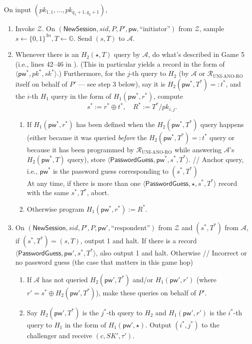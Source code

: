 \documentclass{article}
\theoremstyle{plain}
\theoremstyle{definition}
\theoremstyle{remark}
\newcommand{\group}{\mathbb{G}}
\newcommand{\adv}{\mathcal{A}}
\newcommand{\env}{\mathcal{Z}}
\newcommand{\red}{\mathcal{R}}
\newcommand{\pw}{\mathsf{pw}}
\newcommand{\NewSession}{\mathsf{NewSession}}
\begin{document}
\medskip\noindent
On input $(pk_{1,1},\dots,pk_{q_1+1,q_2+1})$,
\begin{enumerate}
  \item Invoke $\env$. On $(\NewSession, sid, P, P', \pw, \text{``initiator''})$ from $\env$, sample $s \gets \{0,1\}^{3n}, T \gets \group$. Send $(s,T)$ to $\adv$.
  \item Whenever there is an $H_2(\star,T)$ query by $\adv$, do what's described in Game 5 (i.e., lines 42--46 in ). (This in particular yields a record in the form of $\langle\pw^*,pk^*,sk^*\rangle$.) Furthermore, for the $j$-th query to $H_2$ (by $\adv$ or $\red_\text{UNI-ANO-RO}$ itself on behalf of $P'$ --- see step 3 below), say it is $H_2(\pw^*,T^*) =: t^*$, and the $i$-th $H_1$ query in the form of $H_1(\pw^*,r^*)$, compute
      \[
      s^* := r^* \oplus t^*, \quad R^* := T^*/pk_{i,j}.
      \]
      \begin{enumerate}
        \item If $H_1(\pw^*,r^*)$ has been defined when the $H_2(\pw^*,T^*)$ query happens (either because it was queried \emph{before} the $H_2(\pw^*,T^*) =: t^*$ query or because it has been programmed by $\red_\text{UNI-ANO-RO}$ while answering $\adv$'s $H_2(\pw^*,T)$ query), store $\langle\mathsf{PasswordGuess},\pw^*,s^*,T^*\rangle$. \quad // \textcolor[gray]{0.5}{Anchor query, i.e., $\pw^*$ is the password guess corresponding to $(s^*,T^*)$} \\
            At any time, if there is more than one $\langle\mathsf{PasswordGuess},\star,s^*,T^*\rangle$ record with the same $s^*,T^*$, abort.
        \item Otherwise program $H_1(\pw^*,r^*) := R^*$.
      \end{enumerate}
  \item On $(\NewSession, sid, P', P, \pw', \text{``respondent''})$ from $\env$ and $(s^*,T^*)$ from $\adv$, if $(s^*,T^*) = (s,T)$, output 1 and halt. If there is a record $\langle\mathsf{PasswordGuess},\allowbreak\pw',s^*,T^*\rangle$, also output 1 and halt. Otherwise \quad // \textcolor[gray]{0.5}{Incorrect or no password guess (the case that matters in this game hop)}
      \begin{enumerate}
        \item If $\adv$ has not queried $H_2(\pw',T^*)$ and/or $H_1(\pw',r')$ (where $r' = s^* \oplus H_2(\pw',T^*)$), make these queries on behalf of $P'$.
        \item Say $H_2(\pw',T^*)$ is the $j^*$-th query to $H_2$ and $H_1(\pw',r')$ is the $i^*$-th query to $H_1$ in the form of $H_1(\pw',\star)$. Output $(i^*,j^*)$ to the challenger and receive $(c,SK',\tau')$.

\end{enumerate}
\end{enumerate}
\end{document}
